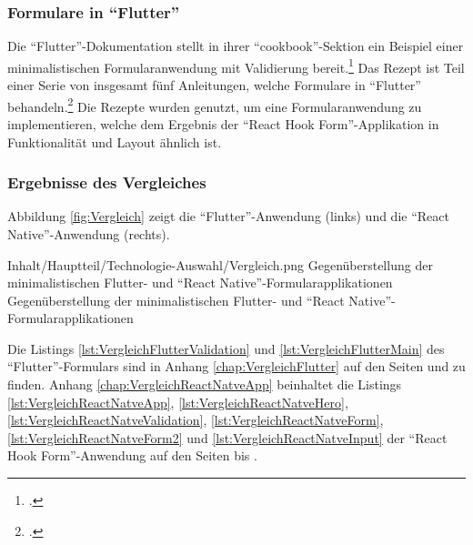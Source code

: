 \subsubsection{Formulare in \enquote{Flutter}}
Die \enquote{Flutter}-Dokumentation stellt in ihrer \enquote{cookbook}-Sektion ein Beispiel einer minimalistischen Formularanwendung mit Validierung bereit.\footcite[Vgl.][]{BuildAFormWithValidation}
Das Rezept ist Teil einer Serie von insgesamt fünf Anleitungen, welche Formulare in \enquote{Flutter} behandeln.\footcite[Vgl.][]{FormsFlutter}
Die Rezepte wurden genutzt,
um eine Formularanwendung zu implementieren,
welche dem Ergebnis der \enquote{React Hook Form}-Applikation in Funktionalität und Layout ähnlich ist.

\clearpage
\subsubsection{Ergebnisse des Vergleiches}


Abbildung \ref{fig:Vergleich} zeigt die \enquote{Flutter}-Anwendung (links) und die \enquote{React Native}-Anwendung (rechts).

\begin{alexfigure}{Inhalt/Hauptteil/Technologie-Auswahl/Vergleich.png}
   {Gegenüberstellung der minimalistischen {Flutter}- und \enquote{React Native}-Formular\-ap\-pli\-ka\-ti\-on\-en}
   {Gegenüberstellung der minimalistischen {Flutter}- und \enquote{React Native}-Formular\-ap\-pli\-ka\-ti\-on\-en}
 
   \label{fig:Vergleich}
 
 \end{alexfigure}

 Die Listings \ref{lst:VergleichFlutterValidation} und \ref{lst:VergleichFlutterMain}
 des \enquote{Flutter}-Formulars sind in Anhang \ref{chap:VergleichFlutter}
 auf den Seiten \pageref{lst:VergleichFlutterValidation} und \pageref{lst:VergleichFlutterMain} zu finden.
 Anhang \ref{chap:VergleichReactNatveApp} beinhaltet die Listings
 \ref{lst:VergleichReactNatveApp}, \ref{lst:VergleichReactNatveHero}, \ref{lst:VergleichReactNatveValidation},
 \ref{lst:VergleichReactNatveForm},  \ref{lst:VergleichReactNatveForm2} und \ref{lst:VergleichReactNatveInput} 
 der \enquote{React Hook Form}-Anwendung auf den Seiten \pageref{lst:VergleichReactNatveApp} bis \pageref{lst:VergleichReactNatveInput}.

